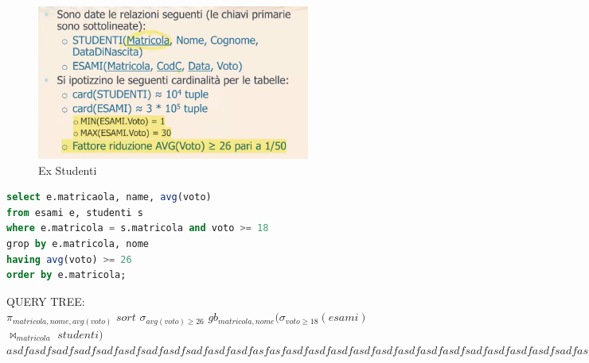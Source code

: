 \documentclass[12pt]{article}
\begin{document}
\begin{example}{}{}
    \begin{figure}[H]
        \centering
        \includegraphics[width=0.8\textwidth]{ex-studenti.png}
        \caption{Ex Studenti}
        \label{fig:ex-studenti}
    \end{figure}

\begin{lstlisting}[language=sql]
select e.matricaola, name, avg(voto)
from esami e, studenti s
where e.matricola = s.matricola and voto >= 18
grop by e.matricola, nome
having avg(voto) >= 26
order by e.matricola;
\end{lstlisting}
    
   QUERY TREE: \\
   $\pi_{matricola,nome,avg(voto)}$ $sort$ $\sigma_{avg(voto) \geqslant  26} $  $ gb_{matricola,nome} ( \sigma_{voto \geqslant 18}(esami)$ $\bowtie_{matricola}$ $studenti )$
   $asdf asd fsa df sadf sa dfas dfsad fa sdf sa dfa sd fa sdfas fasfasdf asdf as df asdf as dfas df asdf as dfsadfa sdfasdf asdf sadf asfdas s f asdf asd f$


\end{example}
\end{document}

